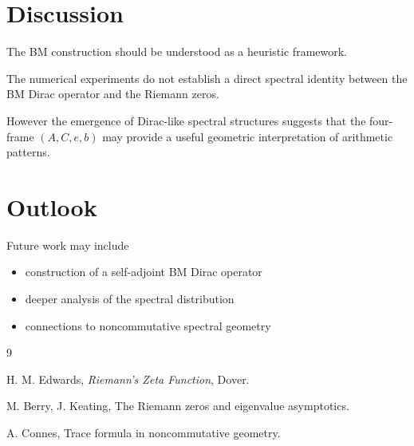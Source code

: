 \documentclass[11pt,a4paper]{article}
\begin{document}
	\section{Discussion}
	
	The BM construction should be understood as a heuristic
	framework.
	
	The numerical experiments do not establish a direct spectral
	identity between the BM Dirac operator and the Riemann zeros.
	
	However the emergence of Dirac-like spectral structures
	suggests that the four-frame $(A,C,e,b)$ may provide a useful
	geometric interpretation of arithmetic patterns.
	
	\section{Outlook}
	
	Future work may include
	
	\begin{itemize}
		\item construction of a self-adjoint BM Dirac operator
		\item deeper analysis of the spectral distribution
		\item connections to noncommutative spectral geometry
	\end{itemize}
	
	\begin{thebibliography}{9}
		
		H. M. Edwards,
		\textit{Riemann's Zeta Function},
		Dover.
		
		M. Berry, J. Keating,
		The Riemann zeros and eigenvalue asymptotics.
		
		A. Connes,
		Trace formula in noncommutative geometry.
		
	\end{thebibliography}
	
\end{document}
